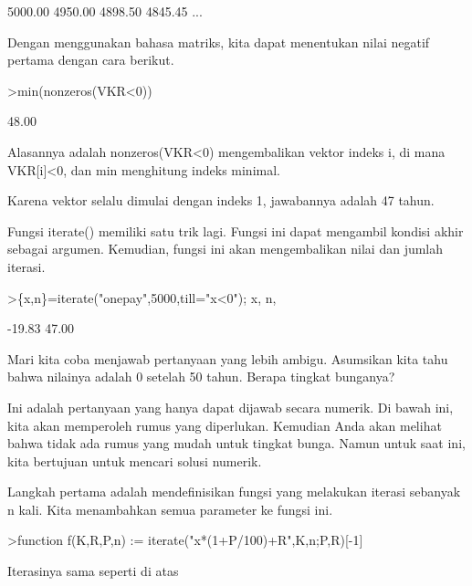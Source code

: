 \documentclass[a4paper,10pt]{article}
\begin{document}
\begin{eulernotebook}
\begin{eulercomment}
\begin{eulercomment}
\begin{eulercomment}
\begin{eulercomment}
\begin{eulercomment}
\begin{eulercomment}
\begin{eulercomment}
\begin{eulercomment}
\begin{euleroutput}
      5000.00     4950.00     4898.50     4845.45     ...
\end{euleroutput}
\begin{eulercomment}
Dengan menggunakan bahasa matriks, kita dapat menentukan nilai negatif
pertama dengan cara berikut.
\end{eulercomment}
\begin{eulerprompt}
>min(nonzeros(VKR<0))
\end{eulerprompt}
\begin{euleroutput}
        48.00 
\end{euleroutput}
\begin{eulercomment}
Alasannya adalah nonzeros(VKR\textless{}0) mengembalikan vektor indeks i, di
mana VKR[i]\textless{}0, dan min menghitung indeks minimal.

Karena vektor selalu dimulai dengan indeks 1, jawabannya adalah 47
tahun.

Fungsi iterate() memiliki satu trik lagi. Fungsi ini dapat mengambil
kondisi akhir sebagai argumen. Kemudian, fungsi ini akan mengembalikan
nilai dan jumlah iterasi.
\end{eulercomment}
\begin{eulerprompt}
>\{x,n\}=iterate("onepay",5000,till="x<0"); x, n,
\end{eulerprompt}
\begin{euleroutput}
       -19.83 
        47.00 
\end{euleroutput}
\begin{eulercomment}
Mari kita coba menjawab pertanyaan yang lebih ambigu. Asumsikan kita
tahu bahwa nilainya adalah 0 setelah 50 tahun. Berapa tingkat
bunganya?

Ini adalah pertanyaan yang hanya dapat dijawab secara numerik. Di
bawah ini, kita akan memperoleh rumus yang diperlukan. Kemudian Anda
akan melihat bahwa tidak ada rumus yang mudah untuk tingkat bunga.
Namun untuk saat ini, kita bertujuan untuk mencari solusi numerik.

Langkah pertama adalah mendefinisikan fungsi yang melakukan iterasi
sebanyak n kali. Kita menambahkan semua parameter ke fungsi ini.
\end{eulercomment}
\begin{eulerprompt}
>function f(K,R,P,n) := iterate("x*(1+P/100)+R",K,n;P,R)[-1]
\end{eulerprompt}
\begin{eulercomment}
Iterasinya sama seperti di atas


\end{eulercomment}
\end{eulercomment}
\end{eulercomment}
\end{eulercomment}
\end{eulercomment}
\end{eulercomment}
\end{eulercomment}
\end{eulercomment}
\end{eulercomment}
\end{eulernotebook}
\end{document}
